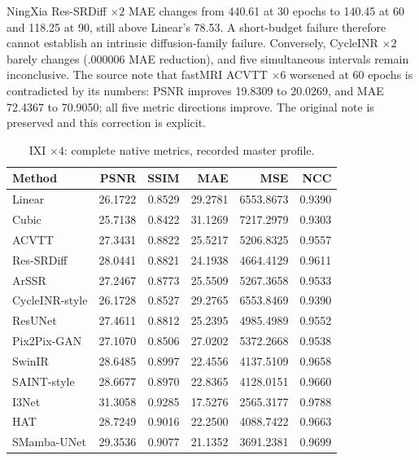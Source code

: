 NingXia Res-SRDiff $\times2$ MAE changes from 440.61 at 30 epochs to 140.45 at 60 and 118.25 at 90, still above Linear's 78.53. A short-budget failure therefore cannot establish an intrinsic diffusion-family failure. Conversely, CycleINR $\times2$ barely changes (.000006 MAE reduction), and five simultaneous intervals remain inconclusive. The source note that fastMRI ACVTT $\times6$ worsened at 60 epochs is contradicted by its numbers: PSNR improves 19.8309 to 20.0269, and MAE 72.4367 to 70.9050; all five metric directions improve. The original note is preserved and this correction is explicit.
\begin{table}[t]\centering\small
\caption{IXI $\times4$: complete native metrics, recorded master profile.}
\begin{tabular}{lrrrrr}\toprule Method&PSNR&SSIM&MAE&MSE&NCC\\\midrule
Linear & 26.1722 & 0.8529 & 29.2781 & 6553.8673 & 0.9390\\
Cubic & 25.7138 & 0.8422 & 31.1269 & 7217.2979 & 0.9303\\
ACVTT & 27.3431 & 0.8822 & 25.5217 & 5206.8325 & 0.9557\\
Res-SRDiff & 28.0441 & 0.8821 & 24.1938 & 4664.4129 & 0.9611\\
ArSSR & 27.2467 & 0.8773 & 25.5509 & 5267.3658 & 0.9533\\
CycleINR-style & 26.1728 & 0.8527 & 29.2765 & 6553.8469 & 0.9390\\
ResUNet & 27.4611 & 0.8812 & 25.2395 & 4985.4989 & 0.9552\\
Pix2Pix-GAN & 27.1070 & 0.8506 & 27.0202 & 5372.2668 & 0.9538\\
SwinIR & 28.6485 & 0.8997 & 22.4556 & 4137.5109 & 0.9658\\
SAINT-style & 28.6677 & 0.8970 & 22.8365 & 4128.0151 & 0.9660\\
I3Net & 31.3058 & 0.9285 & 17.5276 & 2565.3177 & 0.9788\\
HAT & 28.7249 & 0.9016 & 22.2500 & 4088.7422 & 0.9663\\
SMamba-UNet & 29.3536 & 0.9077 & 21.1352 & 3691.2381 & 0.9699\\
\bottomrule\end{tabular}\end{table}
